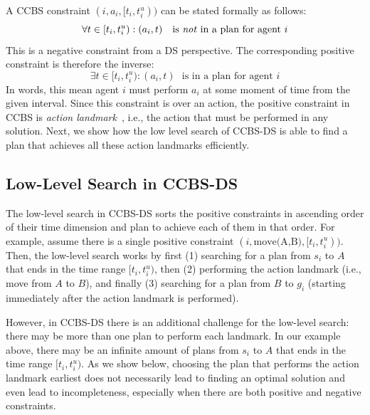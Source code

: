 \documentclass[letterpaper]{article} %
\newcommand{\ccbs}{\ac{CCBS}\xspace}
\newcommand{\ccbsds}{\ac{CCBS-DS}\xspace}
\newcommand{\ds}{\ac{DS}\xspace}
\begin{document}
A \ccbs constraint $(i, a_i, [t_i, t_i^u))$ can be stated formally as follows:
\[
\forall t\in [t_i, t_i^u): (a_i, t) ~~~ \text{is \emph{not} in a plan for agent $i$}
\]
This is a negative constraint from a \ds perspective.
The corresponding positive constraint is therefore the inverse: %
\[
\exists t\in [t_i, t_i^u): (a_i, t) ~~~ \text{is in a plan for agent $i$}
\]
In words, this mean agent $i$ must perform $a_i$ at some moment of time from the given interval.
Since this constraint is over an action, the positive constraint in \ccbs is \emph{action landmark}~\cite{karpas2009cost},
i.e., the action that must be performed in any solution. Next, we show how the low level search of \ccbsds is able to find a plan that achieves all these action landmarks efficiently.

\subsection{Low-Level Search in \ccbsds}

The low-level search in \ccbsds sorts the positive constraints in ascending order of their time dimension and plan to achieve each of them in that order.
For example, assume there is a single positive constraint $(i, \text{move(A,B)}, [t_i, t_i^u))$.
Then, the low-level search works by first
(1) searching for a plan from $s_i$ to $A$ that ends in the time range $[t_i, t_i^u)$,
then (2) performing the action landmark (i.e., move from $A$ to $B$),
and finally (3) searching for a plan from $B$ to $g_i$ (starting immediately after the action landmark is performed).


However, in \ccbsds there is an additional challenge for the low-level search: there may be more than one plan to perform each landmark.
In our example above, there may be an infinite amount of plans from $s_i$ to $A$  that ends in the time range $[t_i, t_i^u)$.
As we show below, choosing the plan that performs the action landmark earliest does not necessarily lead to finding an optimal solution and even lead to incompleteness, especially when there are both positive and negative constraints.
\end{document}
